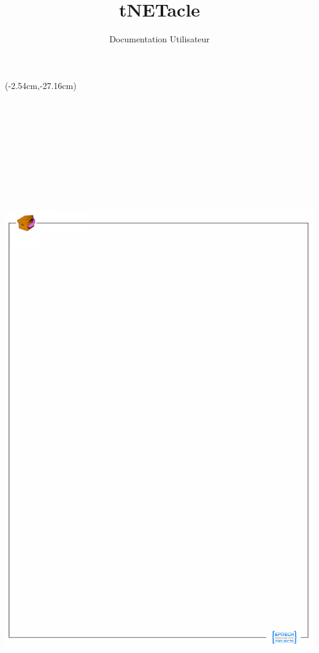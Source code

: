 \documentclass[11pt]{tnetacle-fr}
\title {tNETacle}
\subtitle{Documentation Utilisateur}
\date {}
\begin{document}
\summary{}

\maketitle

\fancyput(-2.54cm,-27.16cm){
\includegraphics[width=21cm,height=29.7cm]{back-tnetacle-eip.jpeg}
}


\tableofcontents








\end{document}
